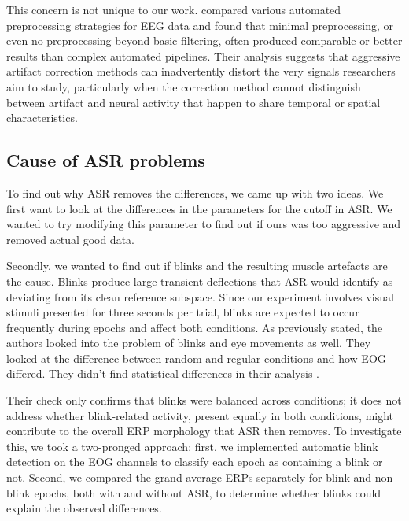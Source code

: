 \documentclass{scrartcl}
\begin{document}
This concern is not unique to our work. \cite{leftalone} compared various automated preprocessing strategies for EEG data and found that minimal preprocessing, or even no preprocessing beyond basic filtering, often produced comparable or better results than complex automated pipelines. Their analysis suggests that aggressive artifact correction methods can inadvertently distort the very signals researchers aim to study, particularly when the correction method cannot distinguish between artifact and neural activity that happen to share temporal or spatial characteristics.



\subsection{Cause of ASR problems}\label{asr-problems}
To find out why ASR removes the differences, we came up with two ideas. We first want to look at the differences in the parameters for the cutoff in ASR. We wanted to try modifying this parameter to find out if ours was too aggressive and removed actual good data.

Secondly, we wanted to find out if blinks and the resulting muscle artefacts are the cause. Blinks produce large transient deflections that ASR would identify as deviating from its clean reference subspace. Since our experiment involves visual stimuli presented for three seconds per trial, blinks are expected to occur frequently during epochs and affect both conditions.  As previously stated, the authors looked into the problem of blinks and eye movements as well. They looked at the difference between random and regular conditions and how EOG differed.  They didn't find statistical differences in their analysis \cite{paper}.

Their check only confirms that blinks were balanced across conditions; it does not address whether blink-related activity, present equally in both conditions, might contribute to the overall ERP morphology that ASR then removes. To investigate this, we took a two-pronged approach: first, we implemented automatic blink detection on the EOG channels to classify each epoch as containing a blink or not. Second, we compared the grand average ERPs separately for blink and non-blink epochs, both with and without ASR, to determine whether blinks could explain the observed differences.
\end{document}
